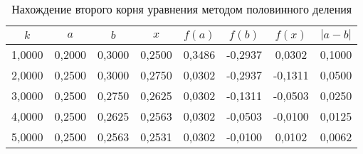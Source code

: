 \begin{table}[]
    \centering
    \begin{tabular}{|c|c|c|c|c|c|c|c|}\hline
$k$	 &	$a$	 &	$b$	 &	$x$	 &	$f(a)$	 &	$f(b)$	 &	$f(x)$	 &	$|a-b|$	\\\hline
1,0000	 &	0,2000	 &	0,3000	 &	0,2500	 &	0,3486	 &	-0,2937	 &	0,0302	 &	0,1000	\\\hline
2,0000	 &	0,2500	 &	0,3000	 &	0,2750	 &	0,0302	 &	-0,2937	 &	-0,1311	 &	0,0500	\\\hline
3,0000	 &	0,2500	 &	0,2750	 &	0,2625	 &	0,0302	 &	-0,1311	 &	-0,0503	 &	0,0250	\\\hline
4,0000	 &	0,2500	 &	0,2625	 &	0,2563	 &	0,0302	 &	-0,0503	 &	-0,0100	 &	0,0125	\\\hline
5,0000	 &	0,2500	 &	0,2563	 &	0,2531	 &	0,0302	 &	-0,0100	 &	0,0102	 &	0,0062	\\\hline
    \end{tabular}
    \caption{Нахождение второго корня уравнения методом половинного деления}
    \label{tab:second-root}
\end{table}